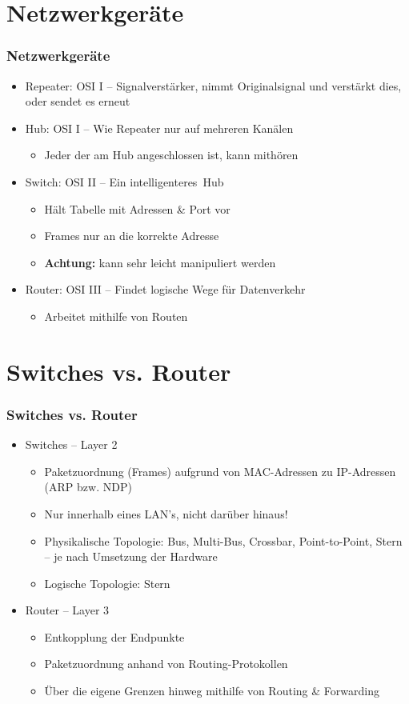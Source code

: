 \documentclass[xcolor=dvipsnames, aspectratio=169]{beamer}
\begin{document}
\section{Netzwerkgeräte}
\begin{frame}
	\frametitle{Netzwerkgeräte}
	\begin{itemize}
		\item Repeater: OSI I -- Signalverstärker, nimmt Originalsignal und verstärkt dies, oder sendet es erneut
		\item Hub: OSI I -- Wie Repeater nur auf mehreren Kanälen
		\begin{itemize}
			\item Jeder der am Hub angeschlossen ist, kann mithören
		\end{itemize}
		\item Switch: OSI II -- Ein \glqq intelligenteres\grqq\ Hub
		\begin{itemize}
			\item Hält Tabelle mit Adressen \& Port vor
			\item Frames nur an die korrekte Adresse
			\item \textbf{Achtung:} kann sehr leicht manipuliert werden
		\end{itemize}
		\item Router: OSI III -- Findet logische Wege für Datenverkehr
		\begin{itemize}
			\item Arbeitet mithilfe von Routen
		\end{itemize}
	\end{itemize}
\end{frame}

\section{Switches vs. Router}
\begin{frame}
	\frametitle{Switches vs. Router}
	\begin{itemize}
		\item Switches -- Layer 2
		\begin{itemize}
			\item Paketzuordnung (Frames) aufgrund von MAC-Adressen zu IP-Adressen (ARP bzw. NDP)
			\item Nur innerhalb eines LAN's, nicht darüber hinaus!
			\item Physikalische Topologie: Bus, Multi-Bus, Crossbar, Point-to-Point, Stern -- je nach Umsetzung der Hardware
			\item Logische Topologie: Stern
		\end{itemize}
		\item Router -- Layer 3
		\begin{itemize}
			\item Entkopplung der Endpunkte
			\item Paketzuordnung anhand von Routing-Protokollen
			\item Über die eigene Grenzen hinweg mithilfe von Routing \& Forwarding
		\end{itemize}
	\end{itemize}
\end{frame}
\end{document}
